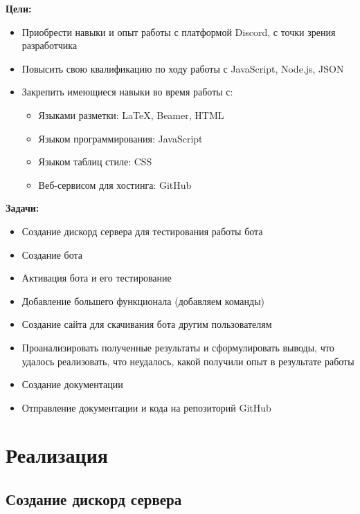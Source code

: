 \documentclass[a4paper,12pt]{article}
\begin{document}
\textbf{Цели:}
\begin{itemize}
    \item Приобрести навыки и опыт работы с платформой Discord, с точки зрения разработчика
    \item Повысить свою квалификацию по ходу работы с JavaScript, Node.js, JSON
    \item Закрепить имеющиеся навыки во время работы с:
    \begin{itemize}
     \item Языками разметки: LaTeX, Beamer, HTML
    \item Языком программирования: JavaScript
    \item Языком таблиц стиле: CSS
    \item Веб-сервисом для хостинга: GitHub
    \end{itemize}
\end{itemize}

\textbf{Задачи:} 
\begin{itemize}
    \item Создание дискорд сервера для тестирования работы бота
    \item Создание бота
    \item Активация бота и его тестирование 
    \item Добавление большего функционала (добавляем команды)
    \item Создание сайта для скачивания бота другим пользователям
    \item Проанализировать полученные результаты и сформулировать выводы, что удалось реализовать, что неудалось, какой получили опыт в результате работы
    \item Создание документации
    \item Отправление документации и кода на репозиторий GitHub
\end{itemize}

\newpage
\section{Реализация}

\subsection{Создание дискорд сервера }
\end{document}
